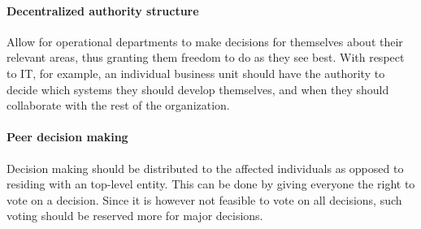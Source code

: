 \paragraph*{Decentralized authority structure} Allow for operational departments to make decisions for themselves about their relevant areas, thus granting them freedom to do as they see best. With respect to IT, for example, an individual business unit should have the authority to decide which systems they should develop themselves, and when they should collaborate with the rest of the organization. 

\paragraph*{Peer decision making} Decision making should be distributed to the affected individuals as opposed to residing with an top-level entity. This can be done by giving everyone the right to vote on a decision. Since it is however not feasible to vote on all decisions, such voting should be reserved more for major decisions. 

